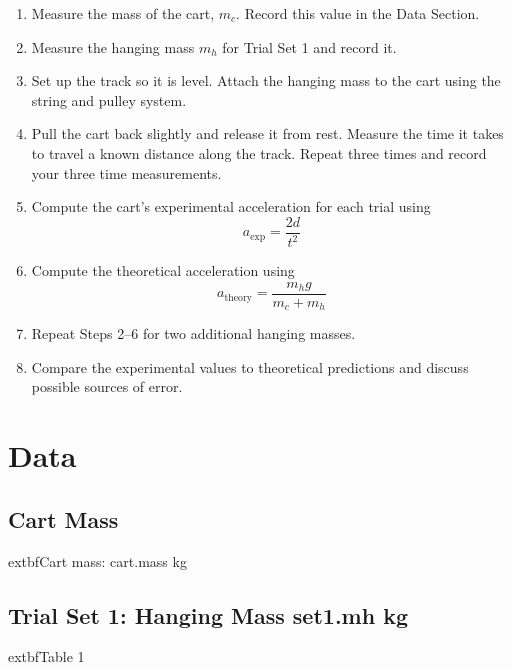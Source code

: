 \documentclass[12pt]{article}
\begin{document}
\begin{enumerate}[label=\arabic*.]
    \item Measure the mass of the cart, $m_c$. Record this value in the Data Section.

    \item Measure the hanging mass $m_h$ for Trial Set 1 and record it.

    \item Set up the track so it is level. Attach the hanging mass to the cart using the string and pulley system.

    \item Pull the cart back slightly and release it from rest. Measure the time it takes to travel a known distance along the track. Repeat three times and record your three time measurements.

    \item Compute the cart's experimental acceleration for each trial using
    \[
    a_{\text{exp}} = \frac{2d}{t^2}
    \]

    \item Compute the theoretical acceleration using
    \[
    a_{\text{theory}} = \frac{m_h g}{m_c + m_h}
    \]

    \item Repeat Steps 2–6 for two additional hanging masses.

    \item Compare the experimental values to theoretical predictions and discuss possible sources of error.
\end{enumerate}

\section*{Data}

\subsection*{Cart Mass}
	extbf{Cart mass:} {{ cart.mass }} kg %


\subsection*{Trial Set 1: Hanging Mass {{ set1.mh }} kg} %

\begin{center}
	extbf{Table 1}
\end{center}
\end{document}
